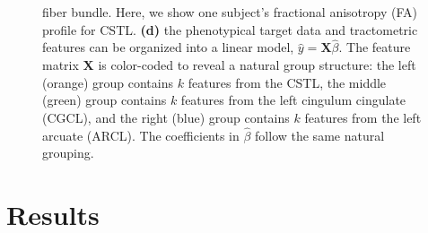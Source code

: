 \documentclass[10pt,letterpaper]{article}
\begin{document}
\begin{figure}[h!]
{        fiber bundle. Here, we show one subject's fractional anisotropy (FA)
        profile for CSTL.
        {\bf (d)} the phenotypical target data and tractometric features can
        be organized into a linear model, $\hat{y} = \mathbf{X}
        \hat{\beta}$. The feature matrix $\mathbf{X}$ is color-coded
        to reveal a natural group structure: the left (orange) group
        contains $k$ features from the CSTL, the middle (green) group
        contains $k$ features from the left cingulum cingulate (CGCL),
        and the right (blue) group
        contains $k$ features from the left arcuate (ARCL). The coefficients in
        $\hat{\beta}$ follow the same natural grouping.
    }
\end{figure}

\section*{Results}
\end{document}
